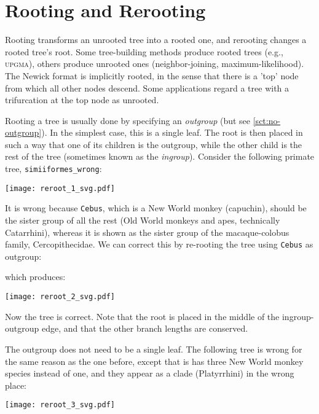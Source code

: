 
\section{Rooting and Rerooting}
\label{sct_reroot}

Rooting transforms an unrooted tree into a rooted one, and rerooting changes a
rooted tree's root. Some tree-building methods produce rooted trees (e.g.,
\textsc{upgma}), others produce unrooted ones (neighbor-joining,
maximum-likelihood).  The Newick format is implicitly rooted, in the sense that
there is a 'top' node from which all other nodes descend. Some applications
regard a tree with a trifurcation at the top node as unrooted. 

Rooting a tree is usually done by specifying an \textit{outgroup} (but see
\ref{sct:no-outgroup}). In the simplest case, this is a single leaf. The root is
then placed in such a way that one of its children is the outgroup, while the
other child is the rest of the tree (sometimes known as the \textit{ingroup}).
Consider the following primate tree, \texttt{simiiformes\_wrong}:

\begin{center}
\texttt{[image: reroot\_1\_svg.pdf]}
\end{center}

\noindent{}It is wrong because \texttt{Cebus}, which is a New World monkey (capuchin), should be the sister group of all the rest (Old World monkeys and apes, technically Catarrhini), whereas it is shown as the sister group of the macaque-colobus family, Cercopithecidae. We can correct this by re-rooting the tree using \texttt{Cebus} as outgroup:

which produces:

\begin{center}
\texttt{[image: reroot\_2\_svg.pdf]}
\end{center}

\noindent{}Now the tree is correct. Note that the root is placed in the middle of the ingroup-outgroup edge, and that the other branch lengths are conserved.

The outgroup does not need to be a single leaf. The following tree is
wrong for the same reason as the one before, except that is has three New World
monkey species instead of one, and they appear as a clade (Platyrrhini) in the
wrong place:

\begin{center}
\texttt{[image: reroot\_3\_svg.pdf]}
\end{center}

